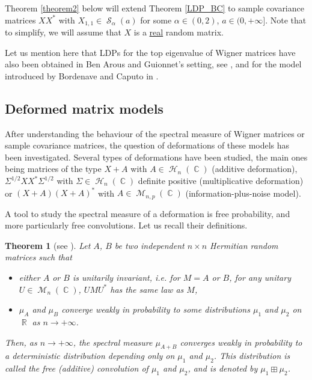 \documentclass[11pt,a4paper]{article}
\DeclareMathOperator{\R}{\mathbb{R}}
\DeclareMathOperator{\C}{\mathbb{C}}
\DeclareMathOperator{\HH}{\mathcal{H}}
\DeclareMathOperator{\MM}{\mathcal{M}}
\DeclareMathOperator{\Sz}{\mathcal{S}}
\DeclareMathOperator{\1}{\mathbf{1}}
\newtheorem{Theorem}[Proposition]{Theorem}
\theoremstyle{definition}
\begin{document}
Theorem \ref{theorem2} below will extend Theorem \ref{LDP_BC} to sample covariance matrices $XX^*$ with $X_{1,1} \in \Sz_{\alpha}(a)$ for some $\alpha \in (0,2)$, $a \in (0,+\infty]$. Note that to simplify, we will assume that $X$ is a \underline{real} random matrix.

Let us mention here that LDPs for the top eigenvalue of Wigner matrices have also been obtained in Ben Arous and Guionnet's setting, see \cite[p. 81]{AGZ}, and for the model introduced by Bordenave and Caputo in \cite{A}.




\subsection{Deformed matrix models} \label{deformed_models}


After understanding the behaviour of the spectral measure of Wigner matrices or sample covariance matrices, the question of deformations of these models has been investigated. Several types of deformations have been studied, the main ones being matrices of the type $X+A$ with $A \in \HH_n(\C)$ (additive deformation), $\Sigma^{1/2}XX^*\Sigma^{1/2}$ with $\Sigma \in \HH_n(\C)$ definite positive (multiplicative deformation) or $(X+A)(X+A)^*$ with $A \in \MM_{n,p}(\C)$ (information-plus-noise model).

A tool to study the spectral measure of a deformation is free probability, and more particularly free convolutions. Let us recall their definitions.

\begin{Theorem}[see \cite{V}]
Let $A$, $B$ be two independent $n \times n$ Hermitian random matrices such that
\begin{itemize}
\item either $A$ or $B$ is unitarily invariant, i.e. for $M = A$ or $B$, for any unitary $U \in \MM_n(\C)$, $UMU^*$ has the same law as $M$,
\item $\mu_A$ and $\mu_B$ converge weakly in probability to some distributions $\mu_1$ and $\mu_2$ on $\R$ as $n \to +\infty$.
\end{itemize}
Then, as $n \to +\infty$, the spectral measure $\mu_{A+B}$ converges weakly in probability to a deterministic distribution depending only on $\mu_1$ and $\mu_2$. This distribution is called the \emph{free (additive) convolution} of $\mu_1$ and $\mu_2$, and is denoted by $\mu_1 \boxplus \mu_2$.
\end{Theorem}
\end{document}
